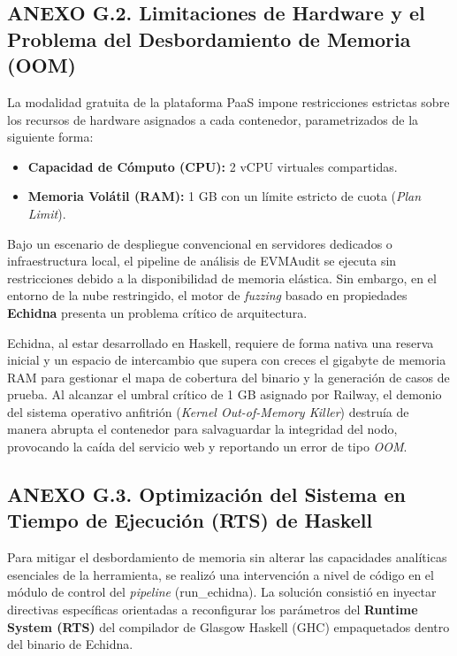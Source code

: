 \subsection{ANEXO G.2. Limitaciones de Hardware y el Problema del
Desbordamiento de Memoria
(OOM)}\label{anexo-g.2.-limitaciones-de-hardware-y-el-problema-del-desbordamiento-de-memoria-oom}

La modalidad gratuita de la plataforma PaaS impone restricciones
estrictas sobre los recursos de hardware asignados a cada contenedor,
parametrizados de la siguiente forma:

\begin{itemize}
\tightlist
\item
  \textbf{Capacidad de Cómputo (CPU):} 2 vCPU virtuales compartidas.
\item
  \textbf{Memoria Volátil (RAM):} 1 GB con un límite estricto de cuota
  (\emph{Plan Limit}).
\end{itemize}

Bajo un escenario de despliegue convencional en servidores dedicados o
infraestructura local, el pipeline de análisis de EVMAudit se ejecuta
sin restricciones debido a la disponibilidad de memoria elástica. Sin
embargo, en el entorno de la nube restringido, el motor de
\emph{fuzzing} basado en propiedades \textbf{Echidna} presenta un
problema crítico de arquitectura.

Echidna, al estar desarrollado en Haskell, requiere de forma nativa una
reserva inicial y un espacio de intercambio que supera con creces el
gigabyte de memoria RAM para gestionar el mapa de cobertura del binario
y la generación de casos de prueba. Al alcanzar el umbral crítico de 1
GB asignado por Railway, el demonio del sistema operativo anfitrión
(\emph{Kernel Out-of-Memory Killer}) destruía de manera abrupta el
contenedor para salvaguardar la integridad del nodo, provocando la caída
del servicio web y reportando un error de tipo \emph{OOM}.

\subsection{ANEXO G.3. Optimización del Sistema en Tiempo de Ejecución
(RTS) de
Haskell}\label{anexo-g.3.-optimizaciuxf3n-del-sistema-en-tiempo-de-ejecuciuxf3n-rts-de-haskell}

Para mitigar el desbordamiento de memoria sin alterar las capacidades
analíticas esenciales de la herramienta, se realizó una intervención a
nivel de código en el módulo de control del \emph{pipeline}
(run\_echidna). La solución consistió en inyectar directivas específicas
orientadas a reconfigurar los parámetros del \textbf{Runtime System
(RTS)} del compilador de Glasgow Haskell (GHC) empaquetados dentro del
binario de Echidna.

